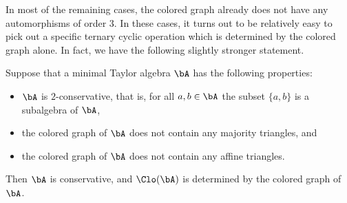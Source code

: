 In most of the remaining cases, the colored graph already does not have any automorphisms of order $3$. In these cases, it turns out to be relatively easy to pick out a specific ternary cyclic operation which is determined by the colored graph alone. In fact, we have the following slightly stronger statement.

\begin{thm} Suppose that a minimal Taylor algebra $\bA$ has the following properties:
\begin{itemize}
\item $\bA$ is $2$-conservative, that is, for all $a,b \in \bA$ the subset $\{a,b\}$ is a subalgebra of $\bA$,
\item the colored graph of $\bA$ does not contain any majority triangles, and
\item the colored graph of $\bA$ does not contain any affine triangles.
\end{itemize}
Then $\bA$ is conservative, and $\Clo(\bA)$ is determined by the colored graph of $\bA$.
\end{thm}
